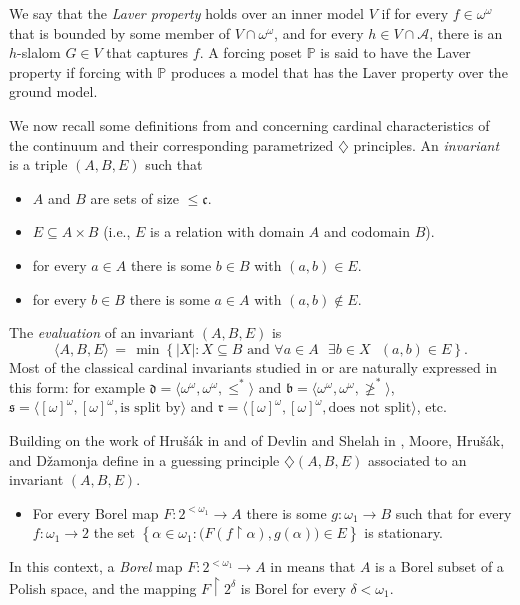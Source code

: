 \documentclass[11pt,leqno]{amsart}
\theoremstyle{definition}
\theoremstyle{remark}
\newcommand{\A}{\mathcal{A}}
\newcommand{\explicitSet}[1]{\left\lbrace #1 \right\rbrace}
\newcommand{\set}[2]{\explicitSet{#1 \colon #2}}
\newcommand{\<}{\langle}
\renewcommand{\>}{\rangle}
\renewcommand{\a}{\alpha}
\newcommand{\dlt}{\delta}
\newcommand{\w}{\omega}
\newcommand{\0}{\emptyset}
\newcommand{\sub}{\subseteq}
\newcommand{\rest}{\!\restriction\!}
\newcommand{\card}[1]{\left\lvert #1 \right\rvert}
\newcommand{\PP}{\mathbb{P}}
\newcommand{\1}{1\hspace{-1.75mm}1}
\newcommand{\dom}{\mathfrak d}
\newcommand{\bdd}{\mathfrak b}
\renewcommand{\split}{\mathfrak s}
\begin{document}
We say that the \emph{Laver property} holds over an inner model $V$ if 
for every $f \in \w^\w$ that is bounded by some member of $V \cap \w^\w$, 
and for every $h \in V \cap \A$, 
there is an $h$-slalom $G \in V$ that captures $f$. 
A forcing poset $\PP$ is said to have the Laver property if forcing with $\PP$ produces a model that has the Laver property over the ground model. 

We now recall some definitions from \cite[Section 4]{Blass} and \cite{MHD} concerning cardinal characteristics of the continuum and their corresponding parametrized $\diamondsuit$ principles. 
An \emph{invariant} is a triple $(A,B,E)$ such that 
\begin{itemize}
\item[$\circ$] $A$ and $B$ are sets of size $\leq\mathfrak c$.
\item[$\circ$] $E \sub A \times B$ (i.e., $E$ is a relation with domain $A$ and codomain $B$).
\item[$\circ$] for every $a \in A$ there is some $b \in B$ with $(a,b) \in E$. 
\item[$\circ$] for every $b \in B$ there is some $a \in A$ with $(a,b) \notin E$. 
\end{itemize}
The \emph{evaluation} of an invariant $(A,B,E)$ is 
$$\<A,B,E\> \,=\, \min \set{\card{X}}{X \sub B \text{ and $\forall a \in A$ $\exists b \in X$ }(a,b) \in E}.$$
Most of the classical cardinal invariants studied in \cite{Blass} or \cite{vD} are naturally expressed in this form: for example $\dom = \<\w^\w,\w^\w,\leq^*\>$ and $\bdd = \<\w^\w,\w^\w,\not\geq^*\>$, $\split = \<[\w]^\w,[\w]^\w,\text{is split by}\>$ and $\mathfrak r = \<[\w]^\w,[\w]^\w,\text{does not split}\>$, etc. 

Building on the work of Hru\v{s}\'ak in \cite{Hrusak} and of Devlin and Shelah in \cite{DS}, Moore, Hru\v{s}\'ak, and D\v{z}amonja define in \cite{MHD} a guessing principle $\diamondsuit(A,B,E)$ associated to an invariant $(A,B,E)$. 
\begin{itemize}
\item[$\diamondsuit(A,B,E):\hspace{-9.75mm}$]\hspace{9.75mm} For every Borel map $F: 2^{<\w_1} \to A$ there is some $g: \w_1 \to B$ such that for every $f: \w_1 \to 2$ the set $\set{\a \in \w_1}{\big(F(f \rest \a),g(\a)\big) \in E}$ is stationary. 
\end{itemize}
In this context, a \emph{Borel} map $F: 2^{<\w_1} \to A$ in \cite{MHD} means that $A$ is a Borel subset of a Polish space, and the mapping $F \rest 2^\dlt$ is Borel for every $\dlt < \w_1$. 
\end{document}
